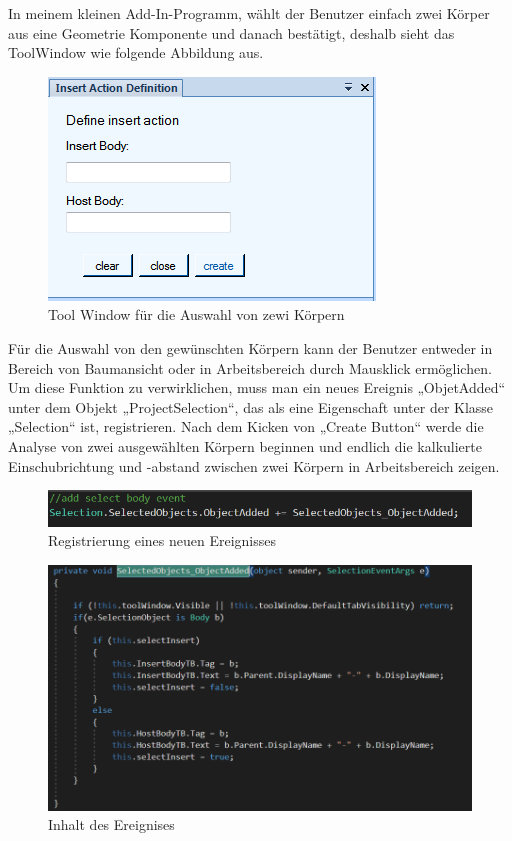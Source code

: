 \documentclass[14pt,a4paper,titlepage]{article}
\begin{document}
\begin{itemize}
				\bigbreak
				In meinem kleinen Add-In-Programm, wählt der Benutzer einfach zwei Körper aus eine Geometrie Komponente und danach bestätigt, deshalb sieht das ToolWindow wie folgende Abbildung aus. \bigbreak
				\begin{figure}[h!]
					\centering
					\includegraphics[width=0.8\linewidth]{inserttoolwindow.png}
					\caption{Tool Window für die Auswahl von zewi Körpern}
				\end{figure}
				\pagebreak
				Für die Auswahl von den gewünschten Körpern kann der Benutzer entweder in Bereich von Baumansicht oder in Arbeitsbereich durch Mausklick ermöglichen.  Um diese Funktion zu verwirklichen, muss man ein neues Ereignis „ObjetAdded“ unter dem Objekt „ProjectSelection“, das als eine Eigenschaft unter der Klasse „Selection“ ist, registrieren. Nach dem Kicken von „Create Button“ werde die Analyse von zwei ausgewählten Körpern beginnen und endlich die kalkulierte Einschubrichtung und -abstand zwischen zwei Körpern in Arbeitsbereich zeigen. 
				\begin{figure}[h!]
					\centering
					\includegraphics[width=0.6\linewidth]{ObjectAdded.png}
					\caption{Registrierung eines neuen Ereignisses}
				\end{figure}
				\begin{figure}[h!]
					\centering
					\includegraphics[width=0.6\linewidth]{ObjectAddedImplement.png}
					\caption{Inhalt des Ereignises}
				\end{figure}
			\end{itemize}
			\pagebreak
				
\end{document}
